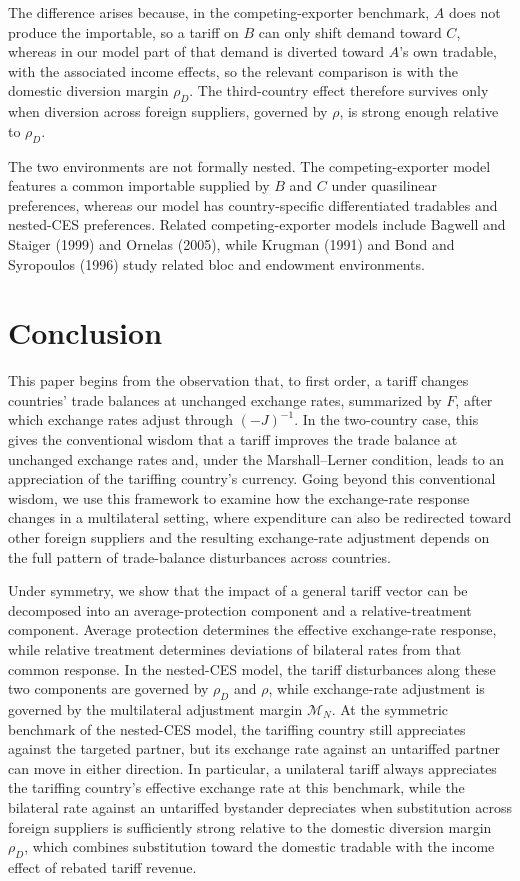 \documentclass[11pt]{article}
\begin{document}
The difference arises because, in the competing-exporter benchmark, $A$ does not produce the importable, so a tariff on $B$ can only shift demand toward $C$, whereas in our model part of that demand is diverted toward $A$'s own tradable, with the associated income effects, so the relevant comparison is with the domestic diversion margin $\rho_D$. The third-country effect therefore survives only when diversion across foreign suppliers, governed by $\rho$, is strong enough relative to $\rho_D$.

The two environments are not formally nested. The competing-exporter model features a common importable supplied by $B$ and $C$ under quasilinear preferences, whereas our model has country-specific differentiated tradables and nested-CES preferences. Related competing-exporter models include Bagwell and Staiger (1999) and Ornelas (2005), while Krugman (1991) and Bond and Syropoulos (1996) study related bloc and endowment environments.
\section{Conclusion}

This paper begins from the observation that, to first order, a tariff changes countries' trade balances at unchanged exchange rates, summarized by $F$, after which exchange rates adjust through $(-J)^{-1}$. In the two-country case, this gives the conventional wisdom that a tariff improves the trade balance at unchanged exchange rates and, under the Marshall--Lerner condition, leads to an appreciation of the tariffing country's currency. Going beyond this conventional wisdom, we use this framework to examine how the exchange-rate response changes in a multilateral setting, where expenditure can also be redirected toward other foreign suppliers and the resulting exchange-rate adjustment depends on the full pattern of trade-balance disturbances across countries.

Under symmetry, we show that the impact of a general tariff vector can be decomposed into an average-protection component and a relative-treatment component. Average protection determines the effective exchange-rate response, while relative treatment determines deviations of bilateral rates from that common response. In the nested-CES model, the tariff disturbances along these two components are governed by $\rho_D$ and $\rho$, while exchange-rate adjustment is governed by the multilateral adjustment margin $\mathcal M_N$. At the symmetric benchmark of the nested-CES model, the tariffing country still appreciates against the targeted partner, but its exchange rate against an untariffed partner can move in either direction. In particular, a unilateral tariff always appreciates the tariffing country's effective exchange rate at this benchmark, while the bilateral rate against an untariffed bystander depreciates when substitution across foreign suppliers is sufficiently strong relative to the domestic diversion margin $\rho_D$, which combines substitution toward the domestic tradable with the income effect of rebated tariff revenue.
\end{document}
